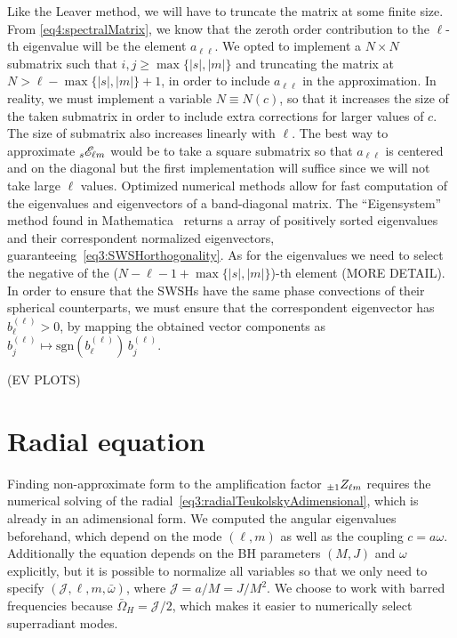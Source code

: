 Like the Leaver method, we will have to truncate the matrix at some finite size.
From \eqref{eq4:spectralMatrix}, we know that the zeroth order contribution to the $\ell$-th eigenvalue will be the element $a_{\ell\ell}$.
We opted to implement a $N\times N$ submatrix such that $i,j\ge\max\{|s|,|m|\}$ and truncating the matrix at $N > \ell - \max\{|s|,|m|\} + 1$, in order to include $a_{\ell\ell}$ in the approximation.
In reality, we must implement a variable $N\equiv N(c)$, so that it increases the size of the taken submatrix in order to include extra corrections for larger values of $c$. The size of submatrix also increases linearly with $\ell$.
The best way to approximate $\uu[s]{\mathscr{E}}{\ell m}$ would be to take a square submatrix so that $a_{\ell\ell}$ is centered and on the diagonal but the first implementation will suffice since we will not take large $\ell$ values.
Optimized numerical methods allow for fast computation of the eigenvalues and eigenvectors of a band-diagonal matrix.
The ``Eigensystem'' method found in Mathematica\texttrademark~ returns a array of positively sorted eigenvalues and their correspondent normalized eigenvectors, guaranteeing~\eqref{eq3:SWSHorthogonality}. As for the eigenvalues we need to select the negative of the ($N-\ell-1+\max\{|s|,|m|\}$)-th element (MORE DETAIL). In order to ensure that the SWSHs have the same phase convections of their spherical counterparts, we must ensure that the correspondent eigenvector has $b_\ell^{(\ell)}>0$, by mapping the obtained vector components as $b_j^{(\ell)}\mapsto \mathrm{sgn}(b_\ell^{(\ell)}) \,b_j^{(\ell)}$.

(EV PLOTS)

\section{Radial equation}

Finding non-approximate form to the amplification factor $\uu[\pm 1]{Z}{\ell m}$ requires the numerical solving of the radial~\eqref{eq3:radialTeukolskyAdimensional}, which is already in an adimensional form.
We computed the angular eigenvalues beforehand, which depend on the mode $(\ell,m)$ as well as the coupling $c=a\omega$.
Additionally the equation depends on the BH parameters $(M,J)$ and $\omega$ explicitly, but it is possible to normalize all variables so that we only need to specify $(\mathscr{J}, \ell, m, \bar{\omega})$, where $\mathscr{J}=a/M=J/M^2$.
We choose to work with barred frequencies because $\bar{\Omega}_H = \mathscr{J}/2$, which makes it easier to numerically select superradiant modes.

